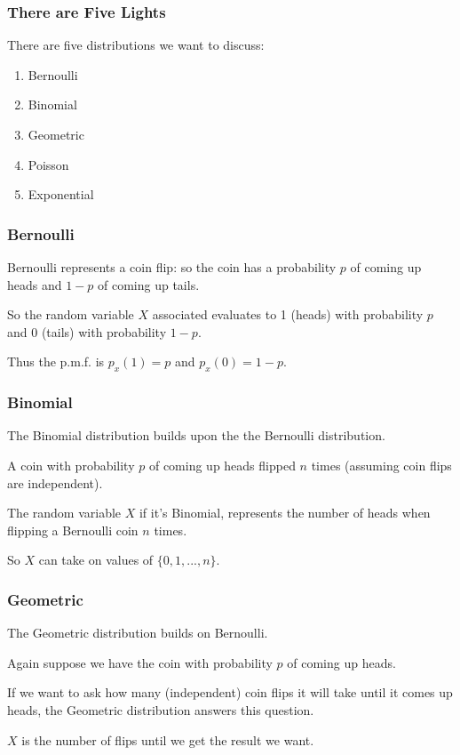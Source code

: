 \begin{frame}
\frametitle{There are Five Lights}

There are five distributions we want to discuss: 

\begin{enumerate}
	\item Bernoulli 
	\item Binomial
	\item Geometric
	\item Poisson
	\item Exponential
\end{enumerate}

\end{frame}



\begin{frame}
\frametitle{Bernoulli}

Bernoulli represents a coin flip: so the coin has a probability $p$ of coming up heads and $1-p$ of coming up tails. 

So the random variable $X$ associated evaluates to 1 (heads) with probability $p$ and 0 (tails) with probability $1-p$. 

Thus the p.m.f. is $p_{x}(1) = p$ and $p_{x}(0) = 1 - p$. 

\end{frame}



\begin{frame}
\frametitle{Binomial}

The Binomial distribution builds upon the the Bernoulli distribution. 

A coin with probability $p$ of coming up heads flipped $n$ times (assuming coin flips are independent). 

The random variable $X$ if it's Binomial, represents the number of heads when flipping a Bernoulli coin $n$ times. 

So $X$ can take on values of $\{0, 1, ..., n\}$. 

\end{frame}



\begin{frame}
\frametitle{Geometric}

The Geometric distribution builds on Bernoulli. 

Again suppose we have the coin with probability $p$ of coming up heads. 

If we want to ask how many (independent) coin flips it will take until it comes up heads, the Geometric distribution answers this question. 

$X$ is the number of flips until we get the result we want.


\end{frame}



